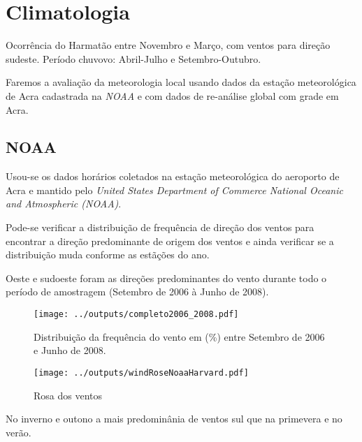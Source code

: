 \section{Climatologia}

Ocorrência do Harmatão entre Novembro e Março, com ventos para direção sudeste.
Período chuvovo: Abril-Julho e Setembro-Outubro.

Faremos a avaliação da meteorologia local usando dados da estação meteorológica
de Acra cadastrada na \textit{NOAA} e com dados de re-análise global com grade
em Acra. 

\subsection{NOAA}

Usou-se os dados horários coletados na estação meteorológica do aeroporto 
de Acra e mantido pelo
\textit{United States Department of Commerce National Oceanic 
and Atmospheric (NOAA)}.

Pode-se verificar a distribuição de frequência de
direção dos ventos para encontrar a direção predominante de origem dos ventos e 
ainda verificar se a distribuição muda conforme as estãções do ano.  



Oeste e sudoeste foram as direções predominantes do vento durante todo o período 
de amostragem (Setembro de 2006 à Junho de 2008).
 
\begin{figure}[H]
\begin{center}
  \texttt{[image: ../outputs/completo2006\_2008.pdf]}
  \caption{Distribuição da frequência do vento em (\%) entre
           Setembro de 2006 e Junho de 2008.}
\end{center}
\end{figure}


\begin{figure}[H]
\begin{center}
  \texttt{[image: ../outputs/windRoseNoaaHarvard.pdf]}
  \caption{Rosa dos ventos}
\end{center}
\end{figure}


No inverno e outono a mais predominânia de ventos sul que na primevera 
e no verão. 

